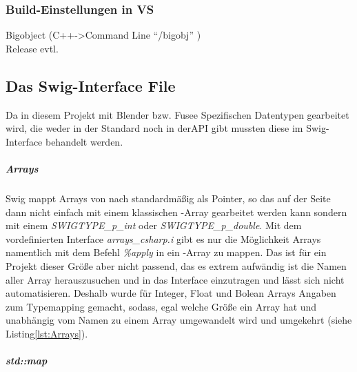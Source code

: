   

\subsubsection{Build-Einstellungen in VS}\label{subsubsec:Build}
	Bigobject (C++->Command Line "`/bigobj"' )\\
	Release evtl.


\subsection{Das Swig-Interface File}\label{subsubsec:swiginterface}
Da in diesem Projekt mit Blender bzw. Fusee Spezifischen Datentypen gearbeitet wird, die weder in der Standard \CC noch in der\CS API gibt mussten diese im Swig-Interface behandelt werden. 

\subparagraph{Arrays}
Swig mappt Arrays von \CC nach \CS standardmäßig als Pointer, so das auf der \CS Seite dann nicht einfach mit einem klassischen \CS-Array gearbeitet werden kann sondern mit einem \emph{SWIGTYPE\_p\_int} oder \emph{SWIGTYPE\_p\_double}. Mit dem vordefinierten Interface \emph{arrays\_csharp.i} gibt es nur die Möglichkeit Arrays namentlich mit dem Befehl \emph{\%apply} in ein \CS-Array zu mappen. Das ist für ein Projekt dieser Größe aber nicht passend, das es extrem aufwändig ist die Namen aller Array herauszusuchen und in das Interface einzutragen und lässt sich nicht automatisieren. Deshalb wurde für Integer, Float und Bolean Arrays Angaben zum Typemapping gemacht, sodass, egal welche Größe ein Array hat und unabhängig vom Namen zu einem \CS Array umgewandelt wird und umgekehrt (siehe Listing\ref{lst:Arrays}). 

\begin{code}[caption={Beispiel Arraymapping},label={lst:Arrays}, escapechar=|]
\end{code}

\subparagraph{std::map}

